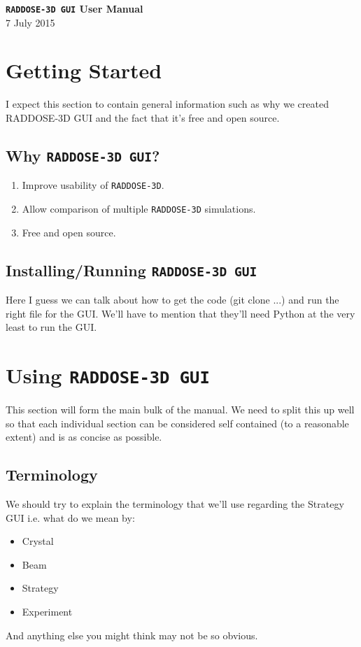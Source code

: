 \documentclass[a4paper]{article}
\newcommand{\RDG}{\texttt{RADDOSE-3D GUI}\xspace}
\newcommand{\RD}{\texttt{RADDOSE-3D}\xspace}
\begin{document}
\begin{center}
\noindent \textsf{\huge\textbf{\RDG User Manual}}\\[0.3em]
7 July 2015\\[3.5em]
\end{center}

\tableofcontents

\newpage

\section{Getting Started}
I expect this section to contain general information such as why we created RADDOSE-3D GUI and the fact that it's free and open source.

\subsection{Why \RDG ?}
\begin{enumerate}
\item Improve usability of \RD.
\item Allow comparison of multiple \RD simulations.
\item Free and open source.
\end{enumerate}

\subsection{Installing/Running \RDG}
Here I guess we can talk about how to get the code (git clone ...) and run the right file for the GUI. We'll have to mention that they'll need Python at the very least to run the GUI. 

\section{Using \RDG}
This section will form the main bulk of the manual. We need to split this up well so that each individual section can be considered self contained (to a reasonable extent) and is as concise as possible.

\subsection{Terminology}
We should try to explain the terminology that we'll use regarding the Strategy GUI i.e. what do we mean by:
\begin{itemize}
\item Crystal
\item Beam
\item Strategy
\item Experiment
\end{itemize}
And anything else you might think may not be so obvious.
\end{document}
